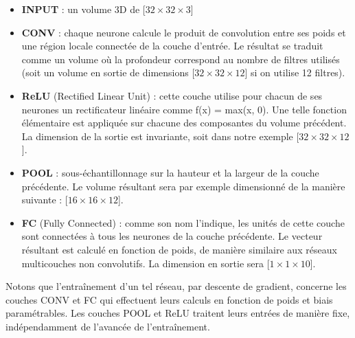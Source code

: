 \documentclass[12pt]{report}
\begin{document}
\begin{itemize}
  \item \textbf{INPUT} : un volume 3D de [$32 \times 32 \times 3$]
  \item \textbf{CONV} : chaque neurone calcule le produit de convolution entre ses poids et une région locale connectée de la couche d’entrée. Le résultat se traduit comme un volume où la profondeur correspond au nombre de filtres utilisés (soit un volume en sortie de dimensions [$32 \times 32 \times 12$] si on utilise 12 filtres).

  \item \textbf{ReLU} (Rectified Linear Unit) : cette couche utilise pour chacun de ses neurones un rectificateur linéaire comme f(x) = max(x, 0). Une telle fonction élémentaire est appliquée sur chacune des composantes du volume précédent. La dimension de la sortie est invariante, soit dans notre exemple [$32 \times 32 \times 12$]. 
  \item \textbf{POOL} : sous-échantillonnage sur la hauteur et la largeur de la couche précédente. Le volume résultant sera par exemple dimensionné de la manière suivante : [$16 \times 16 \times 12$].
  \item \textbf{FC} (Fully Connected) : comme son nom l’indique, les unités de cette couche sont connectées à tous les neurones de la couche précédente. Le vecteur résultant est calculé en fonction de poids, de manière similaire aux réseaux multicouches non convolutifs. La dimension en sortie sera [$1 \times 1 \times 10$].

\end{itemize}
Notons que l’entraînement d’un tel réseau, par descente de gradient, concerne les couches CONV et FC qui effectuent leurs calculs en fonction de poids et biais paramétrables. Les couches POOL et ReLU traitent leurs entrées de manière fixe, indépendamment de l’avancée de l’entraînement.
\end{document}
